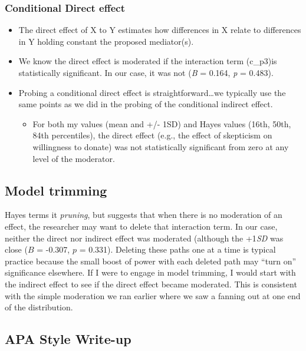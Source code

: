 \documentclass[
  english,
]{book}
\providecommand{\tightlist}{%
  \setlength{\itemsep}{0pt}\setlength{\parskip}{0pt}}
\begin{document}
\hypertarget{conditional-direct-effect}{%
\subsubsection{Conditional Direct effect}\label{conditional-direct-effect}}

\begin{itemize}
\tightlist
\item
  The direct effect of X to Y estimates how differences in X relate to differences in Y holding constant the proposed mediator(s).
\item
  We know the direct effect is moderated if the interaction term (c\_p3)is statistically significant. In our case, it was not (\emph{B} = 0.164, \emph{p} = 0.483).
\item
  Probing a conditional direct effect is straightforward\ldots we typically use the same points as we did in the probing of the conditional indirect effect.

  \begin{itemize}
  \tightlist
  \item
    For both my values (mean and +/- 1SD) and Hayes values (16th, 50th, 84th percentiles), the direct effect (e.g., the effect of skepticism on willingness to donate) was not statistically significant from zero at any level of the moderator.
  \end{itemize}
\end{itemize}

\hypertarget{model-trimming}{%
\subsection{Model trimming}\label{model-trimming}}

Hayes terms it \emph{pruning}, but suggests that when there is no moderation of an effect, the researcher may want to delete that interaction term. In our case, neither the direct nor indirect effect was moderated (although the +1\emph{SD} was close (\(B\) = -0.307, \(p\) = 0.331). Deleting these paths one at a time is typical practice because the small boost of power with each deleted path may ``turn on'' significance elsewhere. If I were to engage in model trimming, I would start with the indirect effect to see if the direct effect became moderated. This is consistent with the simple moderation we ran earlier where we saw a fanning out at one end of the distribution.

\hypertarget{apa-style-write-up-1}{%
\subsection{APA Style Write-up}\label{apa-style-write-up-1}}
\end{document}
